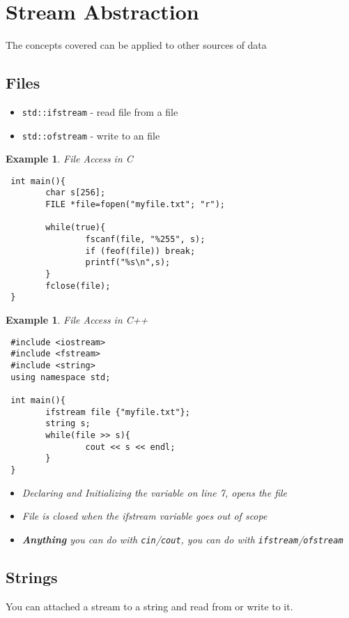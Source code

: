 \documentclass{article}
\newtheorem{ex}[theorem]{Example}
\begin{document}
 \section{Stream Abstraction}
 The  concepts covered can be applied to other sources of data 
 \subsection{Files} 
 \begin{itemize}
 \item \verb|std::ifstream| - read file from a file
 \item \verb|std::ofstream| - write to an file 
 \end{itemize}
 
 \begin{ex}File Access in C 
 \begin{lstlisting}
 int main(){
 		char s[256];
 		FILE *file=fopen("myfile.txt"; "r");
 		
 		while(true){
 				fscanf(file, "%255", s);
 				if (feof(file)) break;
 				printf("%s\n",s);
 		}
 		fclose(file);
 }
 \end{lstlisting}
 \end{ex}
 
 \begin{ex}File Access in C++ 
 \begin{lstlisting}
 #include <iostream>
 #include <fstream>
 #include <string>
 using namespace std;
 
 int main(){
 		ifstream file {"myfile.txt"};
 		string s;
 		while(file >> s){
 				cout << s << endl;
 		}
 }
 \end{lstlisting}
 
  \begin{itemize}
 \item Declaring and Initializing the variable on line 7, opens the file
 \item File is closed when the ifstream variable goes out of scope 
 \item \textbf{Anything} you can do with \verb|cin|/\verb|cout|, you can do with \verb|ifstream|/\verb|ofstream|
 \end{itemize}
 \end{ex}
 
 \subsection{Strings}
 You can attached a stream to a string and read from or write to it. 
 
\end{document}

